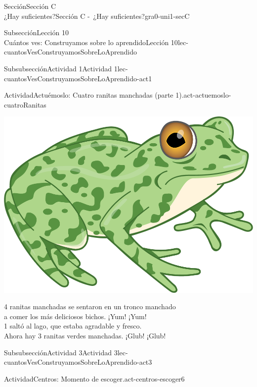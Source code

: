 \begin{sectionptx}{Sección}{{\Large Sección C\\}¿Hay suficientes?}{}{Sección C -~¿Hay suficientes?}{}{}{gra0-uni1-secC}
\begin{subsectionptx}{Subsección}{{\normalsize Lección 10\\[-0.05cm]}Cuántos ves: Construyamos sobre lo aprendido}{}{Lección 10}{}{}{lec-cuantosVesConstruyamosSobreLoAprendido}
\begin{subsubsectionptx}{Subsubsección}{Actividad 1}{}{Actividad 1}{}{}{lec-cuantosVesConstruyamosSobreLoAprendido-act1}
\begin{activity}{Actividad}{Actuémoslo: Cuatro ranitas manchadas (parte 1).}{act-actuemoslo-cuatroRanitas}
\begin{image}{0.275}{0.45}{0.275}{}
\includegraphics[max width=\linewidth, center]{external/png-source/RANA-VERDE.png}
\end{image}%
%
\par
\small
\vspace{2ex}
4 ranitas manchadas se sentaron en un tronco manchado\\
 a comer los más deliciosos bichos. ¡Yum! ¡Yum!\\
 1 saltó al lago, que estaba agradable y fresco.\\
 Ahora hay 3 ranitas verdes manchadas. ¡Glub! ¡Glub!%
\end{activity}%
\end{subsubsectionptx}
%
%
\typeout{************************************************}
\typeout{************************************************}
%
%
%
\typeout{************************************************}
\typeout{************************************************}
%
\clearpage
\begin{subsubsectionptx}{Subsubsección}{Actividad 3}{}{Actividad 3}{}{}{lec-cuantosVesConstruyamosSobreLoAprendido-act3}
\begin{activity}{Actividad}{Centros: Momento de escoger.}{act-centros-escoger6}%

\end{activity}
\end{subsubsectionptx}
\end{subsectionptx}
\end{sectionptx}
